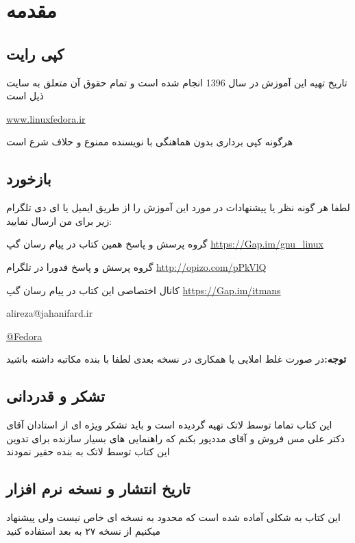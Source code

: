 	\chapter*{مقدمه}\label{ch-0}
	\section{کپی رایت}\label{se-01}
	تاریخ تهیه این آموزش در سال 1396 انجام شده است و تمام حقوق آن متعلق به سایت ذیل است
\begin{flushleft}
\href{www.linuxfedora.ir}{www.linuxfedora.ir}
\end{flushleft}	

هرگونه کپی برداری بدون هماهنگی با نویسنده ممنوع و حلاف شرع است

	\section{بازخورد}\label{se-02}
	لطفا هر گونه نظر یا پیشنهادات در مورد این آموزش را از طریق ایمیل  یا  ای دی تلگرام زیر برای من ارسال نمایید:
		
		گروه پرسش و پاسخ همین کتاب در پیام رسان گپ
		\href{https://Gap.im/gnu\_linux}{https://Gap.im/gnu\_linux}
		
		گروه پرسش و پاسخ فدورا در تلگرام
		\href{https://t.me/joinchat/DSbv30PVmG2lrcJjsAhwCQ}{http://opizo.com/pPkVlQ}
		
	کانال اختصاصی این کتاب در پیام رسان گپ
		\href{https://Gap.im/itmans}{https://Gap.im/itmans}
		
	\begin{flushleft}
		alireza@jahanifard.ir
		
		\href{https://gap.im/fedora}{@Fedora}

	\end{flushleft}
	\textbf{توجه:}در صورت غلط املایی  یا همکاری در نسخه بعدی لطفا با بنده مکاتبه داشته باشید
	\section{تشکر و قدردانی}\label{se-03}
	این کتاب تماما توسط لاتک تهیه گردیده است و باید تشکر ویژه ای از استادان  {\nast آقای دکتر علی مس فروش }و  {\nast آقای مددپور }بکنم که راهنمایی های بسیار سازنده برای تدوین این کتاب توسط لاتک به بنده حقیر نمودند
	\section{تاریخ انتشار و نسخه نرم افزار}\label{se-04}
این کتاب به شکلی آماده شده است که محدود به نسخه ای خاص نیست ولی پیشنهاد میکنیم از نسخه ۲۷ به بعد استفاده کنید
